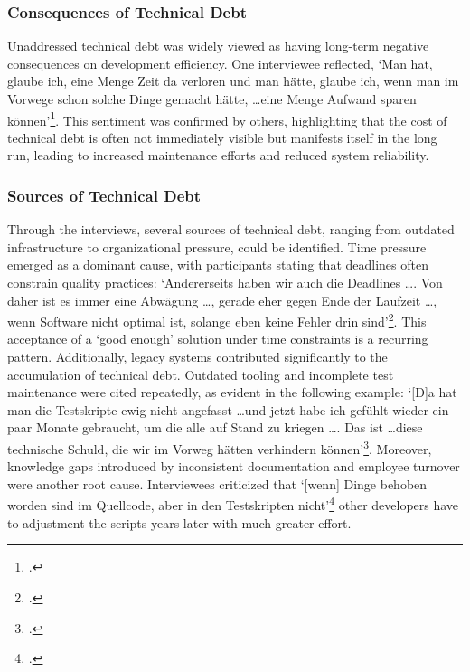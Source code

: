 \subsubsection{Consequences of Technical Debt}
Unaddressed technical debt was widely viewed as having long-term negative consequences on development efficiency. One interviewee reflected, `Man hat, glaube ich, eine Menge Zeit da verloren und man hätte, glaube ich, wenn man im Vorwege schon solche Dinge gemacht hätte, \ldots eine Menge Aufwand sparen können'\footcite[61]{Interview12025}.
This sentiment was confirmed by others, highlighting that the cost of technical debt is often not immediately visible but manifests itself in the long run, leading to increased maintenance efforts and reduced system reliability.

\subsubsection{Sources of Technical Debt}
Through the interviews, several sources of technical debt, ranging from outdated infrastructure to organizational pressure, could be identified. Time pressure emerged as a dominant cause, with participants stating that deadlines often constrain quality practices: `Andererseits haben wir auch die Deadlines \ldots. Von daher ist es immer eine Abwägung
\ldots, gerade eher gegen Ende der Laufzeit \ldots, wenn Software nicht optimal ist, solange eben keine Fehler drin sind'\footcite[69-70]{Interview22025}. This acceptance of a `good enough' solution under time constraints is a recurring pattern.
Additionally, legacy systems contributed significantly to the accumulation of technical debt. Outdated tooling and incomplete test maintenance were cited repeatedly, as evident in the following example: `[D]a hat man die Testskripte ewig nicht angefasst \ldots und jetzt habe ich gefühlt wieder ein paar Monate gebraucht, um die alle auf Stand zu kriegen \ldots.
Das ist \ldots diese technische Schuld, die wir im Vorweg hätten verhindern können'\footcite[65]{Interview12025}. Moreover, knowledge gaps introduced by inconsistent documentation and employee turnover were another root cause. Interviewees criticized that `[wenn] Dinge behoben worden sind im Quellcode, aber in den Testskripten nicht'\footcite[64]{Interview12025}
other developers have to adjustment the scripts years later with much greater effort.

